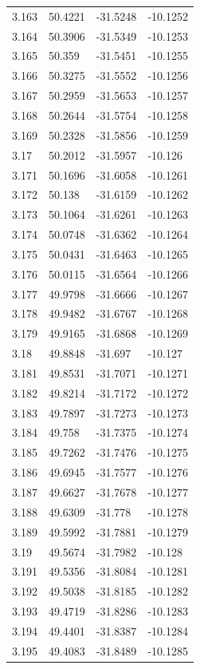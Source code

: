 \begin{tabular}{llll}
3.163 & 50.4221 & -31.5248 & -10.1252 \\
3.164 & 50.3906 & -31.5349 & -10.1253 \\
3.165 & 50.359 & -31.5451 & -10.1255 \\
3.166 & 50.3275 & -31.5552 & -10.1256 \\
3.167 & 50.2959 & -31.5653 & -10.1257 \\
3.168 & 50.2644 & -31.5754 & -10.1258 \\
3.169 & 50.2328 & -31.5856 & -10.1259 \\
3.17 & 50.2012 & -31.5957 & -10.126 \\
3.171 & 50.1696 & -31.6058 & -10.1261 \\
3.172 & 50.138 & -31.6159 & -10.1262 \\
3.173 & 50.1064 & -31.6261 & -10.1263 \\
3.174 & 50.0748 & -31.6362 & -10.1264 \\
3.175 & 50.0431 & -31.6463 & -10.1265 \\
3.176 & 50.0115 & -31.6564 & -10.1266 \\
3.177 & 49.9798 & -31.6666 & -10.1267 \\
3.178 & 49.9482 & -31.6767 & -10.1268 \\
3.179 & 49.9165 & -31.6868 & -10.1269 \\
3.18 & 49.8848 & -31.697 & -10.127 \\
3.181 & 49.8531 & -31.7071 & -10.1271 \\
3.182 & 49.8214 & -31.7172 & -10.1272 \\
3.183 & 49.7897 & -31.7273 & -10.1273 \\
3.184 & 49.758 & -31.7375 & -10.1274 \\
3.185 & 49.7262 & -31.7476 & -10.1275 \\
3.186 & 49.6945 & -31.7577 & -10.1276 \\
3.187 & 49.6627 & -31.7678 & -10.1277 \\
3.188 & 49.6309 & -31.778 & -10.1278 \\
3.189 & 49.5992 & -31.7881 & -10.1279 \\
3.19 & 49.5674 & -31.7982 & -10.128 \\
3.191 & 49.5356 & -31.8084 & -10.1281 \\
3.192 & 49.5038 & -31.8185 & -10.1282 \\
3.193 & 49.4719 & -31.8286 & -10.1283 \\
3.194 & 49.4401 & -31.8387 & -10.1284 \\
3.195 & 49.4083 & -31.8489 & -10.1285 \\

\end{tabular}
